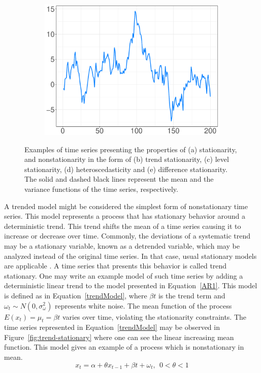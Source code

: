 \documentclass[11pt]{dippg}
\begin{document}
\begin{figure}[!ht]
\begin{subfigure}{.45\textwidth}
 \includegraphics[width=1\linewidth]{images/difference-stationary_ts.pdf}
 \caption{}
 \label{fig:difference-stationary}
\end{subfigure}
\caption[Examples of nonstationary time series]{Examples of time series presenting the properties of (a) stationarity, and nonstationarity in the form of (b) trend stationarity, (c) level stationarity, (d) heteroscedasticity and (e) difference stationarity. The solid and dashed black lines represent the mean and the variance functions of the time series, respectively.}
\label{fig:nonstationarity}
\end{figure}

A trended model might be considered the simplest form of nonstationary time series. This model represents a process that has stationary behavior around a deterministic trend. This trend shifts the mean of a time series causing it to increase or decrease over time. Commonly, the deviations of a systematic trend may be a stationary variable, known as a detrended variable, which may be analyzed instead of the original time series. In that case, usual stationary models are applicable \cite{hanssens_market_2003,yang_nonstationarity_2010}. A time series that presents this behavior is called trend stationary. One may write an example model of such time series by adding a deterministic linear trend to the  model presented in Equation~\ref{AR1}. This model is defined as in Equation~\ref{trendModel}, where ${\beta}t$ is the trend term and $\omega_t \sim N(0, \sigma^2_\omega)$ represents white noise.
The mean function of the process $E(x_t) = \mu_t = {\beta}t$ varies over time, violating the stationarity constraints. The time series represented in Equation~\ref{trendModel} may be observed in Figure~\ref{fig:trend-stationary} where one can see the linear increasing mean function. This model gives an example of a process which is nonstationary in mean.
\begin{equation}\label{trendModel}
x_t = \alpha + {\theta}x_{t-1} + {\beta}t + \omega_t, \ \ 0 < \theta < 1
\end{equation}
\end{document}
